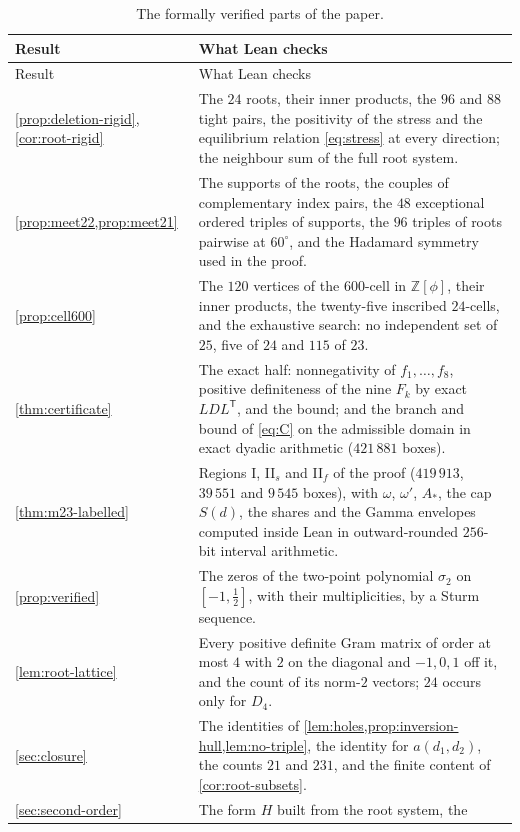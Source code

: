 \documentclass[11pt,reqno]{amsart}
\renewcommand{\_}{\origunderscore\allowbreak}
\numberwithin{equation}{section}
\theoremstyle{plain}
\theoremstyle{definition}
\theoremstyle{remark}
\begin{document}
\begin{longtable}{@{}p{}p{}@{}}
\caption{The formally verified parts of the paper.}\label{tab:formal}\\
\toprule
Result & What Lean checks \\
\midrule
\endfirsthead
\toprule
Result & What Lean checks \\
\midrule
\endhead
\bottomrule
\endfoot
\cref{prop:deletion-rigid}, \cref{cor:root-rigid} & The $24$ roots, their
inner products, the $96$ and $88$ tight pairs, the positivity of the
stress and the equilibrium relation \eqref{eq:stress} at every direction;
the neighbour sum of the full root system. \\
\cref{prop:meet22,prop:meet21} & The supports of the roots, the couples of
complementary index pairs, the $48$ exceptional ordered triples of
supports, the $96$ triples of roots pairwise at $60^\circ$, and the
Hadamard symmetry used in the proof. \\
\cref{prop:cell600} & The $120$ vertices of the $600$-cell in
$\mathbb{Z}[\phi]$, their inner products, the twenty-five inscribed
$24$-cells, and the exhaustive search: no independent set of $25$, five of
$24$ and $115$ of $23$. \\
\cref{thm:certificate} & The exact half: nonnegativity of $f_1,\dots,f_8$,
positive definiteness of the nine $F_k$ by exact $LDL^{\mathsf T}$, and the
bound; and the branch and bound of \eqref{eq:C} on the admissible domain
in exact dyadic arithmetic ($421\,881$ boxes). \\
\cref{thm:m23-labelled} & Regions I, II$_s$ and II$_f$ of the proof
($419\,913$, $39\,551$ and $9\,545$ boxes), with $\omega$, $\omega'$, $A_*$,
the cap $S(d)$, the shares and the Gamma envelopes computed inside Lean
in outward-rounded $256$-bit interval arithmetic. \\
\cref{prop:verified} & The zeros of the two-point polynomial $\sigma_2$ on
$[-1,\frac12]$, with their multiplicities, by a Sturm sequence. \\
\cref{lem:root-lattice} & Every positive definite Gram matrix of order at
most $4$ with $2$ on the diagonal and $-1,0,1$ off it, and the count of its
norm-$2$ vectors; $24$ occurs only for $D_4$. \\
\cref{sec:closure} & The identities of \cref{lem:holes,prop:inversion-hull,lem:no-triple},
the identity for $a(d_1,d_2)$, the counts $21$ and $231$, and the finite
content of \cref{cor:root-subsets}. \\
\cref{sec:second-order} & The form $H$ built from the root system, the

\end{longtable}
\end{document}
